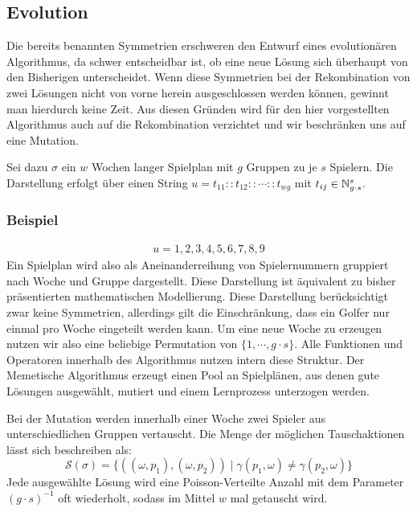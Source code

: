 \subsection{Evolution}
Die bereits benannten Symmetrien erschweren den Entwurf eines evolutionären Algorithmus, da schwer entscheidbar ist, ob eine neue Lösung sich überhaupt von den Bisherigen unterscheidet.
Wenn diese Symmetrien bei der Rekombination von zwei Lösungen nicht von vorne herein ausgeschlossen werden können, gewinnt man hierdurch keine Zeit. 
Aus diesen Gründen wird für den hier vorgestellten Algorithmus auch auf die Rekombination verzichtet und wir beschränken uns auf eine Mutation. 

Sei dazu $\sigma$ ein $w$ Wochen langer Spielplan mit $g$ Gruppen zu je $s$ Spielern. Die Darstellung erfolgt über einen String $u = t_{11} :: t_{12} :: \cdots :: t_{wg}$ mit $t_{ij} \in \mathbb{N}_{g \cdot s}^s$.

\subsubsection{Beispiel}
\begin{equation}
\begin{split} 
  u = 1, 2, 3, 4, 5, 6, 7, 8, 9
\end{split}
\end{equation}
Ein Spielplan wird also als Aneinanderreihung von Spielernummern gruppiert nach Woche und Gruppe dargestellt. Diese Darstellung ist äquivalent zu bisher präsentierten mathematischen Modellierung.
Diese Darstellung berücksichtigt zwar keine Symmetrien, allerdings gilt die Einschränkung, dass ein Golfer nur einmal pro Woche eingeteilt werden kann. 
Um eine neue Woche zu erzeugen nutzen wir also eine beliebige Permutation von $\{ 1, \cdots, g \cdot s\}$. Alle Funktionen und Operatoren innerhalb des Algorithmus nutzen intern diese Struktur. 
Der Memetische Algorithmus erzeugt einen Pool an Spielplänen, aus denen gute Lösungen ausgewählt, mutiert und einem Lernprozess unterzogen werden.

Bei der Mutation werden innerhalb einer Woche zwei Spieler aus unterschiedlichen Gruppen vertauscht. Die Menge der möglichen Tauschaktionen lässt sich beschreiben als:
\begin{equation}
  \mathcal{S}(\sigma) = \{ ((\omega, p_1), (\omega, p_2)) \;|\; \gamma(p_1, \omega) \neq \gamma(p_2, \omega) \}
\end{equation}
Jede ausgewählte Lösung wird eine Poisson-Verteilte Anzahl mit dem Parameter $(g \cdot s)^{-1}$ oft wiederholt, sodass im Mittel $w$ mal getauscht wird.



